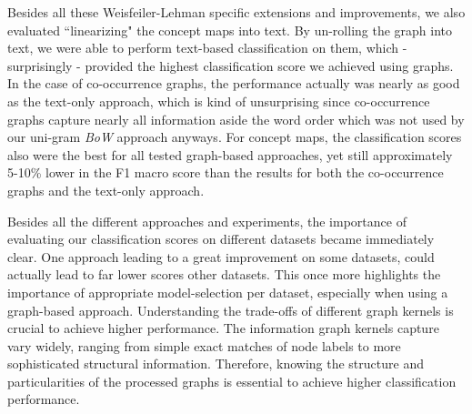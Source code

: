 Besides all these Weisfeiler-Lehman specific extensions and improvements, we also evaluated ``linearizing" the concept maps into text.
By un-rolling the graph into text, we were able to perform text-based classification on them, which - surprisingly - provided the highest classification score we achieved using graphs.
In the case of co-occurrence graphs, the performance actually was nearly as good as the text-only approach, which is kind of unsurprising since co-occurrence graphs capture nearly all information aside the word order which was not used by our uni-gram \textit{BoW} approach anyways.
For concept maps, the classification scores also were the best for all tested graph-based approaches, yet still approximately 5-10\% lower in the F1 macro score than the results for both the co-occurrence graphs and the text-only approach.

Besides all the different approaches and experiments, the importance of evaluating our classification scores on different datasets became immediately clear.
One approach leading to a great improvement on some datasets, could actually lead to far lower scores other datasets.
This once more highlights the importance of appropriate model-selection per dataset, especially when using a graph-based approach.
Understanding the trade-offs of different graph kernels is crucial to achieve higher performance.
The information graph kernels capture vary widely, ranging from simple exact matches of node labels to more sophisticated structural information.
Therefore, knowing the structure and particularities of the processed graphs is essential to achieve higher classification performance.

